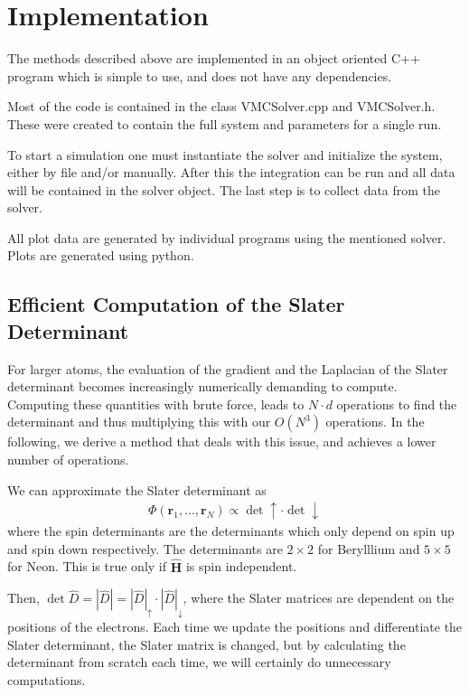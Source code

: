\documentclass[twocolumns, a4paper,10pt,fleqn]{extarticle}
\newcommand{\eq}[1]{{\small\begin{align*}#1\end{align*}}}
\renewcommand\vec[1]{\boldsymbol{\mathbf{#1}}}
\newcommand{\OP}[1]{\mathbf{\widehat{#1}}}
\newcommand{\op}[1]{\hat{#1}}
\begin{document}
\clearpage




\section{Implementation}
The methods described above are implemented in an object oriented C++ program
which is simple to use, and does not have any dependencies. 

Most of the code is contained in the class VMCSolver.cpp and VMCSolver.h. 
These were created to contain the full system and parameters for a single run. 

To start a simulation one must instantiate the solver and 
initialize the system, either by file and/or manually. After this
the integration can be run and all data will be contained in the solver object.
The last step is to collect data from the solver. 

All plot data are generated by individual programs using the mentioned solver. 
Plots are generated using python. 

\subsection{Efficient Computation of the Slater Determinant}

For larger atoms, the evaluation of the gradient and the Laplacian of the Slater
determinant becomes increasingly numerically demanding
to compute. Computing these quantities with brute force, 
leads to $N\cdot d$ operations to find the determinant and thus
multiplying this with our $O(N^3)$ operations.
In the following, we derive a method that deals with this issue, 
and achieves a lower number of operations.

We can approximate the Slater determinant as
\eq{
	\Phi(\vec r_1, ..., \vec r_N) \propto \det\uparrow\cdot\det\downarrow
}
where the spin determinants are the determinants which only depend on spin up and spin down
respectively. The determinants are $2\times 2$ for Berylllium and $5\times 5$ for Neon.
This is true only if $\OP H$ is spin independent.

Then, $\det \op D = |\op D| = |\op D|_{\uparrow}\cdot |\op D|_{\downarrow}$, 
where the Slater matrices are dependent on the positions of the electrons. 
Each time we update the positions and differentiate the Slater determinant,
the Slater matrix is changed, but by calculating the determinant 
from scratch each time, we will certainly do unnecessary computations. 
\end{document}
